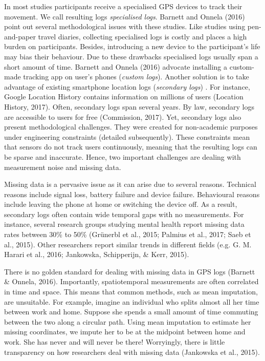 \documentclass[english,man]{apa6}
\theoremstyle{definition}
\theoremstyle{definition}
\theoremstyle{definition}
\theoremstyle{remark}
\begin{document}
In most studies participants receive a specialised GPS devices to track
their movement. We call resulting logs \emph{specialised logs}. Barnett
and Onnela (2016) point out several methodological issues with these
studies. Like studies using pen-and-paper travel diaries, collecting
specialised logs is costly and places a high burden on participants.
Besides, introducing a new device to the participant's life may bias
their behaviour. Due to these drawbacks specialised logs usually span a
short amount of time. Barnett and Onnela (2016) advocate installing a
custom-made tracking app on user's phones (\emph{custom logs}). Another
solution is to take advantage of existing smartphone location logs
(\emph{secondary logs}) . For instance, Google Location History contains
information on millions of users (Location History, 2017). Often,
secondary logs span several years. By law, secondary logs are accessible
to users for free (Commission, 2017). Yet, secondary logs also present
methodological challenges. They were created for non-academic purposes
under engineering constraints (detailed subsequently). These constraints
mean that sensors do not track users continuously, meaning that the
resulting logs can be sparse and inaccurate. Hence, two important
challenges are dealing with measurement noise and missing data.

Missing data is a pervasive issue as it can arise due to several
reasons. Technical reasons include signal loss, battery failure and
device failure. Behavioural reasons include leaving the phone at home or
switching the device off. As a result, secondary logs often contain wide
temporal gaps with no measurements. For instance, several research
groups studying mental health report missing data rates between 30\% to
50\% (Grünerbl et al., 2015; Palmius et al., 2017; Saeb et al., 2015).
Other researchers report similar trends in different fields (e.g. G. M.
Harari et al., 2016; Jankowska, Schipperijn, \& Kerr, 2015).

There is no golden standard for dealing with missing data in GPS logs
(Barnett \& Onnela, 2016). Importantly, spatiotemporal measurements are
often correlated in time and space. This means that common methods, such
as mean imputation, are unsuitable. For example, imagine an individual
who splits almost all her time between work and home. Suppose she spends
a small amount of time commuting between the two along a circular path.
Using mean imputation to estimate her missing coordinates, we impute her
to be at the midpoint between home and work. She has never and will
never be there! Worryingly, there is little transparency on how
researchers deal with missing data (Jankowska et al., 2015).
\end{document}
